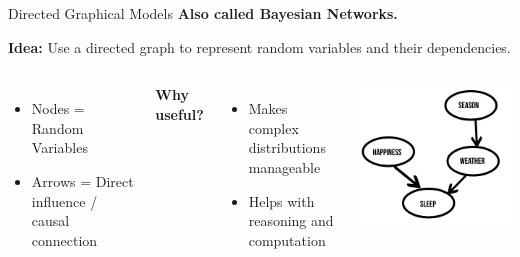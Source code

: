 \documentclass[handout,aspectratio=169]{beamer}
\begin{document}
\begin{frame}{Directed Graphical Models}
  \textbf{Also called Bayesian Networks.}

  \vspace{1em}
  \textbf{Idea:} Use a directed graph to represent random variables and their dependencies.

  \vspace{1em}
  \begin{columns}

  \begin{itemize}
    \item Nodes = Random Variables
    \item Arrows = Direct influence / causal connection
  \end{itemize}

  \vspace{1em}
  \textbf{Why useful?}
  \begin{itemize}
    \item Makes complex distributions manageable
    \item Helps with reasoning and computation
  \end{itemize}
  
    \includegraphics[width=\linewidth]{chapter_figs/01_figs/directed_graph.png}
\end{columns}

\end{frame}
\end{document}
